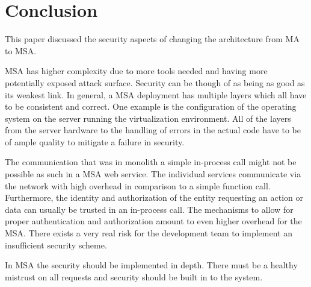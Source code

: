
\section{Conclusion}
\begin{sloppypar}
    This paper discussed the security aspects of changing the architecture from MA to MSA.
\end{sloppypar}
\begin{sloppypar}
    MSA has higher complexity due to more tools needed and having more 
    potentially exposed attack surface. Security can be though of as being as 
    good as its weakest link. In general, a MSA deployment has multiple layers 
    which all have to be consistent and correct. One example is the 
    configuration of the operating system on the server running the 
    virtualization environment. All of the layers from the server hardware to 
    the handling of errors in the actual code have to be of ample quality to 
    mitigate a failure in security.
\end{sloppypar}
\begin{sloppypar}
    The communication that was in monolith a simple in-process call might not be 
    possible as such in a MSA web service. The individual services communicate 
    via the network with high overhead in comparison to a simple function call. 
    Furthermore, the identity and authorization of the entity requesting an action 
    or data can usually be trusted in an in-process call. The mechanisms to 
    allow for proper authentication and authorization amount to even higher 
    overhead for the MSA. There exists a very real risk for the development 
    team to implement an insufficient security scheme.
\end{sloppypar}
\begin{sloppypar}
    In MSA the security should be implemented in depth. There must be a healthy 
    mistrust on all requests and security should be built in to the system.
\end{sloppypar}
